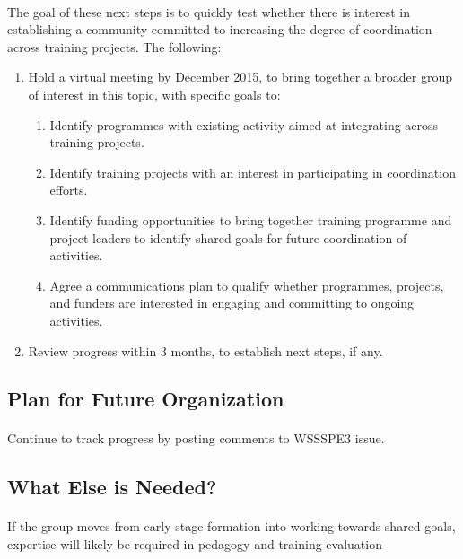 \paragraph{}
The goal of these next steps is to quickly test whether there is interest in establishing a community committed to increasing the degree of coordination across training projects. The following:
\begin{enumerate}
    \item Hold a virtual meeting by December 2015, to bring together a broader group of interest in this topic, with specific goals to:
    \begin{enumerate}
        \item Identify programmes with existing activity aimed at integrating across training projects.
        \item Identify training projects with an interest in participating in coordination efforts.
        \item Identify funding opportunities to bring together training programme and project leaders to identify shared goals for future coordination of activities.
        \item Agree a communications plan to qualify whether programmes, projects, and funders are interested in engaging and committing to ongoing activities.
    \end{enumerate}
    \item Review progress within 3 months, to establish next steps, if any.
\end{enumerate}

\subsection{Plan for Future Organization}
\paragraph{}
Continue to track progress by posting comments to WSSSPE3 issue.

\subsection{What Else is Needed?}
\paragraph{}
If the group moves from early stage formation into working towards shared goals, expertise will likely be required in pedagogy and training evaluation

